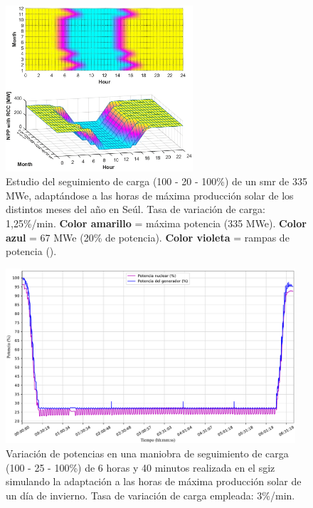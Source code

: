 \begin{enumerate}
    \begin{figure}[h]
      \centering
      \includegraphics[width=0.62\textwidth]{content/figures/seguimiento_carga_smr.png}
      \vspace{-0.1cm}
      \caption{Estudio del seguimiento de carga (100 - 20 - 100\%) de un \acrshort{smr} de 335 MWe, adaptándose a las horas de máxima producción solar de los distintos meses del año en Seúl. Tasa de variación de carga: 1,25\%/min. \textbf{Color amarillo} = máxima potencia (335 MWe). \textbf{Color azul} = 67 MWe (20\% de potencia). \textbf{Color violeta} = rampas de potencia (\cite{SMRs_load_following_PV}).}
      \label{fig:seguimiento de carga_smr}
    \end{figure} 

    \begin{figure}[h!]
      \centering
      \includegraphics[width=0.96\textwidth]{content/figures/sim2_potencias_arreglo.pdf}
      \vspace{-0.3cm}
      \caption{Variación de potencias en una maniobra de  seguimiento de carga (100 - 25 - 100\%) de 6 horas y 40 minutos realizada en el \acrshort{sgiz} simulando la adaptación a las horas de máxima producción solar de un día de invierno. Tasa de variación de carga empleada: 3\%/min.}
      \label{fig:sim2_potencias}
    \end{figure}
\end{enumerate}

